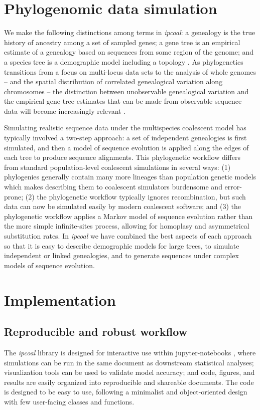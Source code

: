 \documentclass[11pt]{article}
\begin{document}
\section{Phylogenomic data simulation}
We make the following distinctions among terms in \emph{ipcoal}: a genealogy is the true history of ancestry among a set of sampled genes; a gene tree is an empirical estimate of a genealogy based on sequences from some region of the genome; and a species tree is a demographic model including a topology \citep{maddison_gene_1997,pamilo_relationships_1988}. As phylogenetics transitions from a focus on multi-locus data sets \citep{knowles_estimating_2011} to the analysis of whole genomes -- and the spatial distribution of correlated genealogical variation along chromosomes -- the distinction between unobservable genealogical variation and the empirical gene tree estimates that can be made from observable sequence data will become increasingly relevant \citep{adams_binning_2019}. 

Simulating realistic sequence data under the multispecies coalescent model has typically involved a two-step approach: a set of independent genealogies is first simulated, and then a model of sequence evolution is applied along the edges of each tree to produce sequence alignments. This phylogenetic workflow differs from standard population-level coalescent simulations in several ways: (1) phylogenies generally contain many more lineages than population genetic models which makes describing them to coalescent simulators burdensome and error-prone; (2) the phylogenetic workflow typically ignores recombination, but such data can now be simulated easily by modern coalescent software; and (3) the phylogenetic workflow applies a Markov model of sequence evolution rather than the more simple infinite-sites process, allowing for homoplasy and asymmetrical substitution rates. In \emph{ipcoal} we have combined the best aspects of each approach so that it is easy to describe demographic models for large trees, to simulate independent or linked genealogies, and to generate sequences under complex models of sequence evolution. 

\section{Implementation}
\label{sec:headings}
\subsection{Reproducible and robust workflow}
The \emph{ipcoal} library is designed for interactive use within jupyter-notebooks \citep{kluyver_jupyter_2016}, where simulations can be run in the same document as downstream statistical analyses; visualization tools can be used to validate model accuracy; and code, figures, and results are easily organized into reproducible and shareable documents. The code is designed to be easy to use, following a minimalist and object-oriented design with few user-facing classes and functions.
\end{document}
